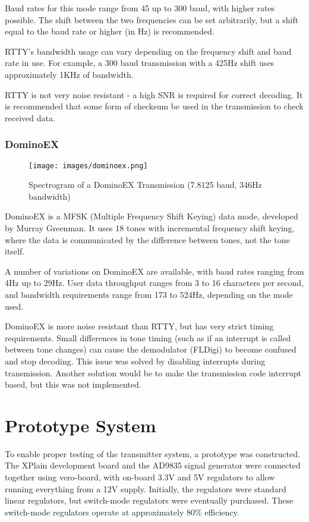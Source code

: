 \documentclass[a4paper,12pt]{article}
\begin{document}
Baud rates for this mode range from 45 up to 300 baud, with higher rates possible. The shift between the two frequencies can be set arbitrarily, but a shift equal to the baud rate or higher (in Hz) is recommended.

RTTY's bandwidth usage can vary depending on the frequency shift and baud rate in use. For example, a 300 baud transmission with a 425Hz shift uses approximately 1KHz of bandwidth. 

RTTY is not very noise resistant - a high SNR is required for correct decoding. It is recommended that some form of checksum be used in the transmission to check received data.

\subsubsection*{DominoEX}
\begin{figure}[h]
  \begin{center}
    \texttt{[image: images/dominoex.png]}
  \end{center}
  \caption{Spectrogram of a DominoEX Transmission (7.8125 baud, 346Hz bandwidth)}
  \label{fig:dominoex}
\end{figure}
DominoEX is a MFSK (Multiple Frequency Shift Keying) data mode, developed by Murray Greenman\citep{ref:dominoex}. It uses 18 tones with incremental frequency shift keying, where the data is communicated by the difference between tones, not the tone itself.

A number of variations on DominoEX are available, with baud rates ranging from 4Hz up to 29Hz. User data throughput ranges from 3 to 16 characters per second, and bandwidth requirements range from 173 to 524Hz, depending on the mode used. 

DominoEX is more noise resistant than RTTY, but has very strict timing requirements. Small differences in tone timing (such as if an interrupt is called between tone changes) can cause the demodulator (FLDigi) to become confused and stop decoding. This issue was solved by disabling interrupts during transmission. Another solution would be to make the transmission code interrupt based, but this was not implemented.

\section{Prototype System}
To enable proper testing of the transmitter system, a prototype was constructed. The XPlain development board and the AD9835 signal generator were connected together using vero-board, with on-board 3.3V and 5V regulators to allow running everything from a 12V supply. Initially, the regulators were standard linear regulators, but switch-mode regulators were eventually purchased. These switch-mode regulators operate at approximately 80\% efficiency.
\end{document}
